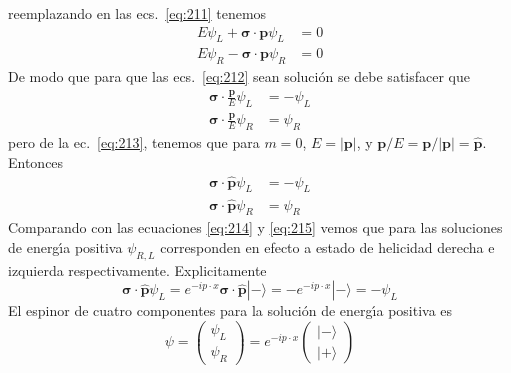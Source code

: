 \begin{subappendices}
reemplazando en las ecs.~\eqref{eq:211} tenemos
\begin{align}
  \label{eq:217}
     E\psi_L+\boldsymbol{\sigma}\cdot\mathbf{p}\psi_L &=0\nonumber\\
   E\psi_R-\boldsymbol{\sigma}\cdot\mathbf{p}\psi_R&=0
\end{align}
De modo que para que las ecs.~\eqref{eq:212} sean soluci\'on se debe satisfacer que
\begin{align}
     \boldsymbol{\sigma}\cdot\frac{\mathbf{p}}{E}\psi_L &=-\psi_L\nonumber\\
   \boldsymbol{\sigma}\cdot\frac{\mathbf{p}}{E}\psi_R&=\psi_R
\end{align}
pero de la ec.~\eqref{eq:213}, tenemos que para $m=0$, $E=|\mathbf{p}|$, y $\mathbf{p}/E=\mathbf{p}/|\mathbf{p}|=\hat{\mathbf{p}}$. Entonces
\begin{align}
  \boldsymbol{\sigma}\cdot\hat{\mathbf{p}}\psi_L &=-\psi_L\nonumber\\
  \boldsymbol{\sigma}\cdot\hat{\mathbf{p}}\psi_R&=\psi_R
\end{align}
Comparando con las ecuaciones \eqref{eq:214} y \eqref{eq:215} vemos que para las soluciones de energ\'\i a positiva $\psi_{R,L}$ corresponden en efecto a estado de helicidad derecha e izquierda respectivamente. Explicitamente
\begin{equation}
  \boldsymbol{\sigma}\cdot\hat{\mathbf{p}}\psi_L=e^{-i p\cdot x}\boldsymbol{\sigma}\cdot\hat{\mathbf{p}}|-\rangle=-e^{-i p\cdot x}|-\rangle=-\psi_L
\end{equation}
El espinor de cuatro componentes para la soluci\'on de energ\'\i a positiva es
\begin{equation}
  \psi=\begin{pmatrix}
    \psi_L\\
    \psi_R
  \end{pmatrix}=e^{-i p\cdot x}\begin{pmatrix}
    |-\rangle\\
    |+\rangle
  \end{pmatrix}
\end{equation}


\end{subappendices}
